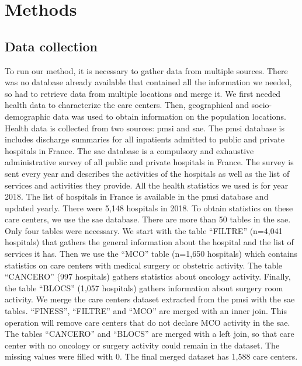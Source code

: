 \section{Methods}

\subsection{Data collection}

To run our method, it is necessary to gather data from multiple sources. There was no database already available that contained all the information we needed, so had to retrieve data from multiple locations and merge it. We first needed health data to characterize the care centers. Then, geographical and socio-demographic data was used to obtain information on the population locations.
Health data is collected from two sources: \ac{pmsi} and \ac{sae}. The \ac{pmsi} database is includes discharge summaries for all inpatients admitted to public and private hospitals in France. The \ac{sae} database is a compulsory and exhaustive administrative survey of all public and private hospitals in France. The survey is sent every year and describes the activities of the hospitals as well as the list of services and activities they provide. All the health statistics we used is for year 2018.
The list of hospitals in France is available in the \ac{pmsi} database and updated yearly. There were 5,148 hospitals in 2018. To obtain statistics on these care centers, we use the \ac{sae} database. There are more than 50 tables in the \ac{sae}. Only four tables were necessary. We start with the table ``FILTRE'' (n=4,041 hospitals) that gathers the general information about the hospital and the list of services it has. Then we use the ``MCO'' table (n=1,650 hospitals) which contains statistics on care centers with medical surgery or obstetric activity. The table ``CANCERO'' (997 hospitals) gathers statistics about oncology activity. Finally, the table ``BLOCS'' (1,057 hospitals) gathers information about surgery room activity.
We merge the care centers dataset extracted from the \ac{pmsi} with the \ac{sae} tables. ``FINESS'', ``FILTRE'' and ``MCO'' are merged with an inner join. This operation will remove care centers that do not declare MCO activity in the \ac{sae}. The tables ``CANCERO'' and ``BLOCS'' are merged with a left join, so that care center with no oncology or surgery activity could remain in the dataset. The missing values were filled with 0. The final merged dataset has 1,588 care centers.
